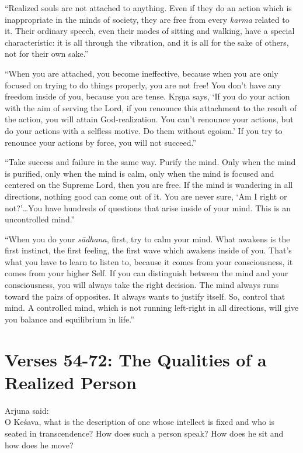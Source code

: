 \enquote{Realized souls are not attached to anything. Even if they do an action which is inappropriate in the minds of society, they are free from every \textit{karma} related to it. Their ordinary speech, even their modes of sitting and walking, have a special characteristic: it is all through the vibration, and it is all for the sake of others, not for their own sake.}

\enquote{When you are attached, you become ineffective, because when you are only focused on trying to do things properly, you are not free! You don’t have any freedom inside of you, because you are tense. Kṛṣṇa says, \enquote{If you do your action with the aim of serving the Lord, if you renounce this attachment to the result of the action, you will attain God-realization. You can’t renounce your actions, but do your actions with a selfless motive. Do them without egoism.} If you try to renounce your actions by force, you will not succeed.}

\enquote{Take success and failure in the same way. Purify the mind. Only when the mind is purified, only when the mind is calm, only when the mind is focused and centered on the Supreme Lord, then you are free. If the mind is wandering in all directions, nothing good can come out of it. You are never sure, \enquote{Am I right or not?}\ldots You have hundreds of questions that arise inside of your mind. This is an uncontrolled mind.}

\enquote{When you do your \textit{sādhana}, first, try to calm your mind. What awakens is the first instinct, the first feeling, the first wave which awakens inside of you. That's what you have to learn to listen to, because it comes from your consciousness, it comes from your higher Self. If you can distinguish between the mind and your consciousness, you will always take the right decision. The mind always runs toward the pairs of opposites. It always wants to justify itself. So, control that mind. A controlled mind, which is not running left-right in all directions, will give you balance and equilibrium in life.}

\section{Verses 54-72: The Qualities of a Realized Person}\label{sec-verses-54-72-the-qualities-of-a-realized-person}

{\hspace*{1em}Arjuna said: \\
O Keśava, what is the description of one whose intellect is fixed and who is seated in transcendence? How does such a person speak? How does he sit and how does he move?}

